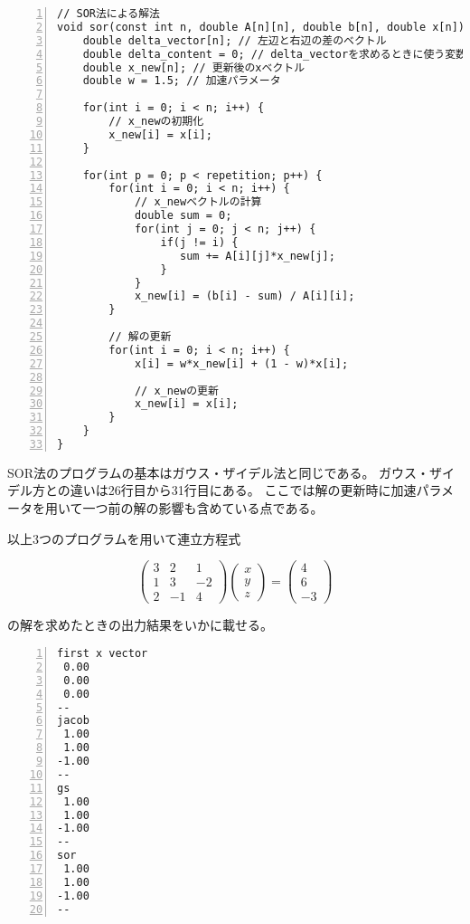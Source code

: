 \documentclass[a4paper]{jsarticle}
\begin{document}
\begin{lstlisting}[caption={\texttt{SOR法のプログラム}}, numbers=left, label={sor_solution}]
// SOR法による解法
void sor(const int n, double A[n][n], double b[n], double x[n]) {
    double delta_vector[n]; // 左辺と右辺の差のベクトル
    double delta_content = 0; // delta_vectorを求めるときに使う変数
    double x_new[n]; // 更新後のxベクトル
    double w = 1.5; // 加速パラメータ

    for(int i = 0; i < n; i++) {
        // x_newの初期化
        x_new[i] = x[i];
    }

    for(int p = 0; p < repetition; p++) {
        for(int i = 0; i < n; i++) {
            // x_newベクトルの計算
            double sum = 0;
            for(int j = 0; j < n; j++) {
                if(j != i) {
                   sum += A[i][j]*x_new[j];
                }
            }
            x_new[i] = (b[i] - sum) / A[i][i];
        }

        // 解の更新
        for(int i = 0; i < n; i++) {
            x[i] = w*x_new[i] + (1 - w)*x[i];

            // x_newの更新
            x_new[i] = x[i];
        }
    }
}
\end{lstlisting}

SOR法のプログラムの基本はガウス・ザイデル法と同じである。
ガウス・ザイデル方との違いは26行目から31行目にある。
ここでは解の更新時に加速パラメータを用いて一つ前の解の影響も含めている点である。

以上3つのプログラムを用いて連立方程式

\begin{equation*}
  \begin{pmatrix}
    3 & 2 & 1 \\
    1 & 3 & -2 \\
    2 & -1 & 4 
  \end{pmatrix}
  \begin{pmatrix}
    x \\
    y \\
    z
  \end{pmatrix}
  =
  \begin{pmatrix}
    4 \\
    6 \\
    -3
  \end{pmatrix}
\end{equation*}

の解を求めたときの出力結果をいかに載せる。

\begin{lstlisting}[caption={\texttt{プログラムの実行結果}}, numbers=left, label={repetition_solution_result}]
first x vector
 0.00
 0.00
 0.00
--
jacob
 1.00
 1.00
-1.00
--
gs
 1.00
 1.00
-1.00
--
sor
 1.00
 1.00
-1.00
--

\end{lstlisting}
\end{document}
